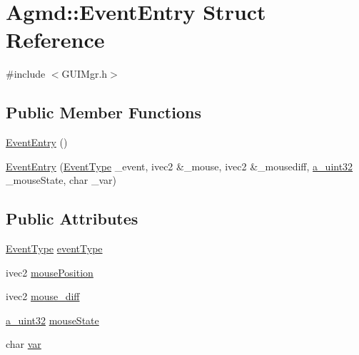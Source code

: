 \hypertarget{struct_agmd_1_1_event_entry}{\section{Agmd\+:\+:Event\+Entry Struct Reference}
\label{struct_agmd_1_1_event_entry}
}


{\ttfamily \#include $<$G\+U\+I\+Mgr.\+h$>$}

\subsection*{Public Member Functions}
\begin{DoxyCompactItemize}
\item 
\hyperlink{struct_agmd_1_1_event_entry_a1cd4b2c996370ad88b5cc58601ab2db5}{Event\+Entry} ()
\item 
\hyperlink{struct_agmd_1_1_event_entry_a96eb9b63ae882b7d210eb37eeb0c078c}{Event\+Entry} (\hyperlink{namespace_agmd_a1ce5270aaf105962b98398a262590f05}{Event\+Type} \+\_\+event, ivec2 \&\+\_\+mouse, ivec2 \&\+\_\+mousediff, \hyperlink{_common_defines_8h_a964296f9770051b9e4807b1f180dd416}{a\+\_\+uint32} \+\_\+mouse\+State, char \+\_\+var)
\end{DoxyCompactItemize}
\subsection*{Public Attributes}
\begin{DoxyCompactItemize}
\item 
\hyperlink{namespace_agmd_a1ce5270aaf105962b98398a262590f05}{Event\+Type} \hyperlink{struct_agmd_1_1_event_entry_af97b49640672c12ff351ea178cabc71a}{event\+Type}
\item 
ivec2 \hyperlink{struct_agmd_1_1_event_entry_a3f4530eee3fca1da2ded38fe6610e4a5}{mouse\+Position}
\item 
ivec2 \hyperlink{struct_agmd_1_1_event_entry_ac96a03f6578bee39b9e13c22216f2e0d}{mouse\+\_\+diff}
\item 
\hyperlink{_common_defines_8h_a964296f9770051b9e4807b1f180dd416}{a\+\_\+uint32} \hyperlink{struct_agmd_1_1_event_entry_af42510fd13aa4e182698be0a50d9a1a0}{mouse\+State}
\item 
char \hyperlink{struct_agmd_1_1_event_entry_afcc1dcd1bcaba9097f5bdb48b7b188dc}{var}
\end{DoxyCompactItemize}


